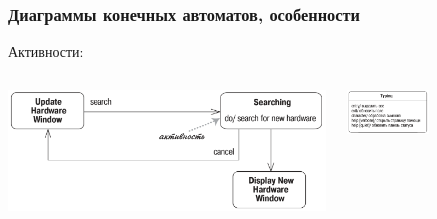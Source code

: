 \documentclass[xetex,mathserif,serif]{beamer}
\begin{document}
	\begin{frame}
		\frametitle{Диаграммы конечных автоматов, особенности}
		Активности:
		\begin{columns}
			\begin{column}{0.5\textwidth}
				\begin{center}
					\includegraphics[width=\textwidth]{stateTransitionInternalEventExample.png}
				\end{center}
			\end{column}
			\begin{column}{0.5\textwidth}
				\begin{center}
					\includegraphics[width=0.5\textwidth]{stateTransitionInternalEvents.png}
				\end{center}
			\end{column}
		\end{columns}


\end{frame}
\end{document}
